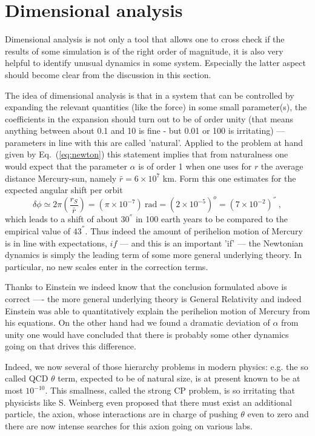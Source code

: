 \documentclass[12pt]{iopart}
\begin{document}
\section{Dimensional analysis}

Dimensional analysis is not only a tool that allows one to cross check if the results of some simulation is
of the right order of magnitude, it is also very helpful to identify unusual dynamics in some system.
Especially the latter aspect should become clear from the discussion in this section.

The idea of dimensional analysis is that in a system that can be controlled by expanding the relevant quantities
(like the force) in some small parameter(s), the coefficients in the expansion should turn out to be of order unity (that
means anything between about 0.1 and 10 is fine - but 0.01 or 100 is irritating) --- parameters in line with this
are called 'natural'. Applied to the problem at hand
given by Eq.~(\ref{eq:newton}) this statement implies that from naturalness one would expect that 
the parameter $\alpha$ is of order 1 when one uses
for $r$ the average distance Mercury-sun, namely $\bar r=6\times 10^7$ km.
Form this one estimates for the expected angular shift per orbit
\begin{equation}
\delta \phi \simeq 2\pi\left(\frac{r_S}{\bar r}\right) = (\pi \times 10^{-7}) \ \mbox{rad} = (2\times 10^{-5})^o = (7\times 10^{-2}) ^{''} \ ,
\end{equation}
which leads to a shift of  about $30^{''}$ in 100 earth years to be compared to the empirical value of $43^{''}$.
 Thus indeed the
amount of perihelion motion of Mercury is in line with expectations, $if$ --- and this is an important 'if' ---
the Newtonian dynamics is simply the leading term of some more general underlying theory. In particular,
no new scales enter in the correction terms.

Thanks to Einstein we indeed know that the conclusion formulated above is correct ---- the more general underlying
theory is General Relativity and indeed Einstein was able to quantitatively explain the perihelion motion of Mercury
from his equations. 
On the other hand had we found a dramatic deviation of $\alpha$ from unity one would have concluded that 
there is probably some other dynamics going on that drives this difference.

Indeed, we now several of those hierarchy problems in modern physics: e.g. the so called QCD $\theta$ term,
expected to be of natural size, is at present known to be at most $10^{-10}$. This smallness, called the
strong CP problem, is so irritating that physicists like S. Weinberg even proposed that there must exist an
additional particle, the axion, whose interactions are in charge of pushing $\theta$ even to zero and there
are now intense searches for this axion going on various labs.
\end{document}
